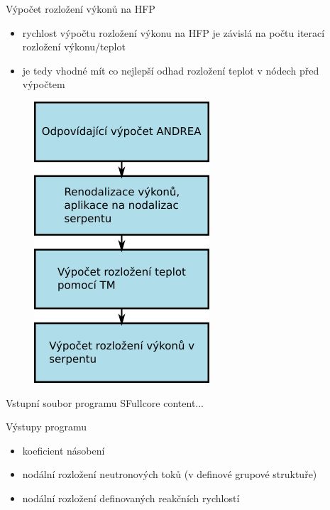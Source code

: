 \documentclass{beamer}
\begin{document}
\begin{frame}{Výpočet rozložení výkonů na HFP}
\begin{block}{}
\begin{itemize}\scriptsize
	\item rychlost výpočtu rozložení výkonu na HFP je závislá na počtu iterací rozložení výkonu/teplot 
    \item je tedy vhodné mít co nejlepší odhad rozložení teplot v nódech před výpočtem
\end{itemize}

\end{block}

\begin{figure}
	\centering
	\includegraphics[scale=0.4]{img/vypocet_teploty.png}
\end{figure}
\end{frame}

\begin{frame}{Vstupní soubor programu SFullcore}
	content...
\end{frame}

\begin{frame}{Výstupy programu}
\begin{itemize}\footnotesize
	\item koeficient násobení
	\item nodální rozložení neutronových toků (v definové grupové struktuře)
	\item nodální rozložení definovaných reakčních rychlostí
\end{itemize}	
	
\end{frame}
\end{document}
